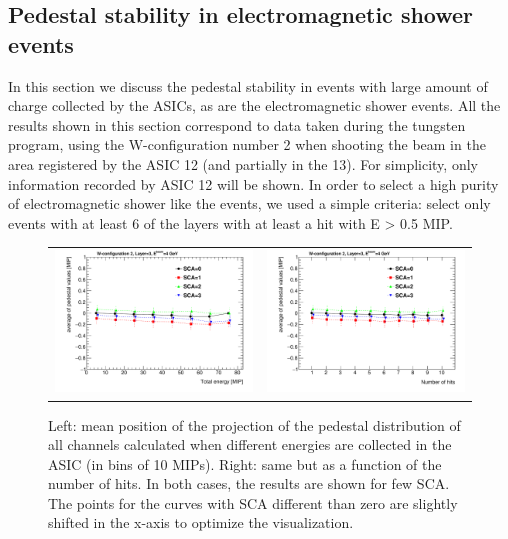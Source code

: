 \documentclass[a4paper,11pt]{article}
\begin{document}
\subsection{Pedestal stability in electromagnetic shower events}
\label{sec:showers}

In this section we discuss the pedestal stability in events with large amount of charge collected by the ASICs, as are the 
electromagnetic shower events. All the results shown in this section correspond to data taken during the tungsten program, 
using the W-configuration number 2 when shooting the beam in the area registered by the ASIC 12 (and partially in the 13). 
For simplicity, only information recorded by ASIC 12 will be shown. 
In order to select a high purity of
electromagnetic shower like the events, 
we used a simple criteria: select only events with at least 6 of the layers with at least a hit with E > 0.5 MIP.

\begin{figure}[!ht]
  \centering 
    \begin{tabular}{ll}
      \includegraphics[width=2.8in]{pedestal_vs_energy_shower-eps-converted-to.pdf} & \includegraphics[width=2.8in]{pedestal_vs_nhits_shower-eps-converted-to.pdf} \\
    \end{tabular}
    \caption{Left: mean position of the projection of the pedestal distribution of all channels
      calculated when different energies are collected in the ASIC (in bins of 10 MIPs).
      Right: same but as a function of the number of hits. In both cases, the results are shown for few SCA.
      The points for the curves with SCA different than zero are slightly shifted in the x-axis to optimize the visualization.}
\label{pedestal_shower_1}
\end{figure}
\end{document}
